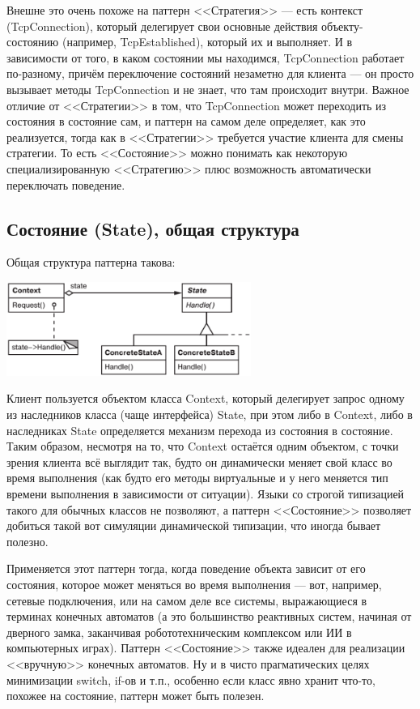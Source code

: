 \documentclass{../../text-style}
\begin{document}
Внешне это очень похоже на паттерн <<Стратегия>> --- есть контекст (TcpConnection), который делегирует свои основные действия объекту-состоянию (например, TcpEstablished), который их и выполняет. И в зависимости от того, в каком состоянии мы находимся, TcpConnection работает по-разному, причём переключение состояний незаметно для клиента --- он просто вызывает методы TcpConnection и не знает, что там происходит внутри. Важное отличие от <<Стратегии>> в том, что TcpConnection может переходить из состояния в состояние сам, и паттерн на самом деле определяет, как это реализуется, тогда как в <<Стратегии>> требуется участие клиента для смены стратегии. То есть <<Состояние>> можно понимать как некоторую специализированную <<Стратегию>> плюс возможность автоматически переключать поведение.

\subsection{Состояние (State), общая структура}

Общая структура паттерна такова:

\begin{center}
    \includegraphics[width=0.6\textwidth]{state.png}
\end{center}

Клиент пользуется объектом класса Context, который делегирует запрос одному из наследников класса (чаще интерфейса) State, при этом либо в Context, либо в наследниках State определяется механизм перехода из состояния в состояние. Таким образом, несмотря на то, что Context остаётся одним объектом, с точки зрения клиента всё выглядит так, будто он динамически меняет свой класс во время выполнения (как будто его методы виртуальные и у него меняется тип времени выполнения в зависимости от ситуации). Языки со строгой типизацией такого для обычных классов не позволяют, а паттерн <<Состояние>> позволяет добиться такой вот симуляции динамической типизации, что иногда бывает полезно.

Применяется этот паттерн тогда, когда поведение объекта зависит от его состояния, которое может меняться во время выполнения --- вот, например, сетевые подключения, или на самом деле все системы, выражающиеся в терминах конечных автоматов (а это большинство реактивных систем, начиная от дверного замка, заканчивая робототехническим комплексом или ИИ в компьютерных играх). Паттерн <<Состояние>> также идеален для реализации <<вручную>> конечных автоматов. Ну и в чисто прагматических целях минимизации switch, if-ов и т.п., особенно если класс явно хранит что-то, похожее на состояние, паттерн может быть полезен.
\end{document}
